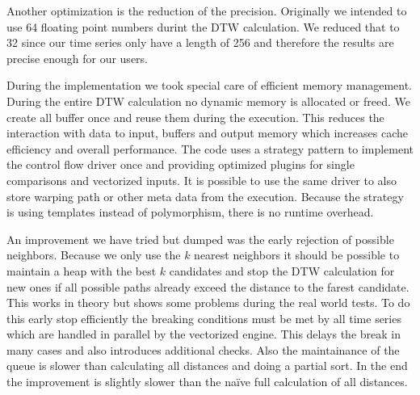 Another optimization is the reduction of the precision. Originally we intended to use \SI{64}{\bit} floating point numbers durint the DTW calculation. We reduced that to \SI{32}{\bit} since our time series only have a length of \num{256} and therefore the results are precise enough for our users.

During the implementation we took special care of efficient memory management. During the entire DTW calculation no dynamic memory is allocated or freed. We create all buffer once and reuse them during the execution. This reduces the interaction with data to input, buffers and output memory which increases cache efficiency and overall performance. The code uses a strategy pattern to implement the control flow driver once and providing optimized plugins for single comparisons and vectorized inputs. It is possible to use the same driver to also store warping path or other meta data from the execution. Because the strategy is using templates instead of polymorphism, there is no runtime overhead.

An improvement we have tried but dumped was the early rejection of possible neighbors. Because we only use the $k$ nearest neighbors it should be possible to maintain a heap with the best $k$ candidates and stop the DTW calculation for new ones if all possible paths already exceed the distance to the farest candidate. This works in theory but shows some problems during the real world tests. To do this early stop efficiently the breaking conditions must be met by all time series which are handled in parallel by the vectorized engine. This delays the break in many cases and also introduces additional checks. Also the maintainance of the queue is slower than calculating all distances and doing a partial sort. In the end the improvement is slightly slower than the na{\"i}ve full calculation of all distances.
